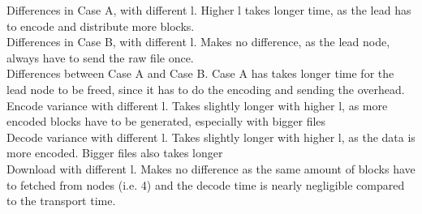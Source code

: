 Differences in Case A, with different l. Higher l takes longer time, as the lead has to encode and distribute more blocks. \\
Differences in Case B, with different l. Makes no difference, as the lead node, always have to send the raw file once. \\
Differences between Case A and Case B. Case A has takes longer time for the lead node to be freed, since it has to do the encoding and sending the overhead.
Encode variance with different l. Takes slightly longer with higher l, as more encoded blocks have to be generated, especially with bigger files\\
Decode variance with different l. Takes slightly longer with higher l, as the data is more encoded. Bigger files also takes longer \\
Download with different l. Makes no difference as the same amount of blocks have to fetched from nodes (i.e. 4) and the decode time is nearly negligible compared to the transport time.